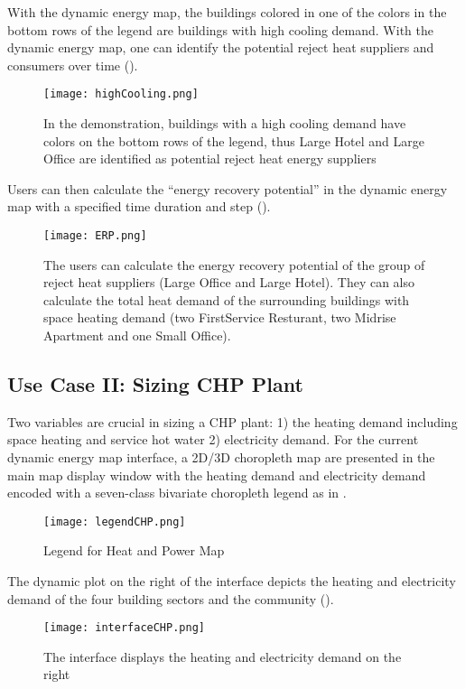 With the dynamic energy map, the buildings colored in one of the
colors in the bottom rows of the legend are buildings with high
cooling demand. With the dynamic energy map, one can identify
the potential reject heat suppliers and consumers over time
().

\begin{figure}[h!]
  \centering
  \texttt{[image: highCooling.png]}
  \caption[Identify Buildings with High Cooling Demand]{In the
    demonstration, buildings with a high cooling demand have colors on
    the bottom rows of the legend, thus Large Hotel and Large Office
    are identified as potential reject heat energy suppliers}
  \label{fig:highCooling}
\end{figure}

Users can then calculate the ``energy recovery potential'' in the
dynamic energy map with a specified time duration and step
().

\begin{figure}[h!]
  \centering
  \texttt{[image: ERP.png]}
  \caption[Calculate Energy Recovery Potential]{The users can
    calculate the energy recovery potential of the group of reject
    heat suppliers (Large Office and Large Hotel). They can also
    calculate the total heat demand of the surrounding buildings with
    space heating demand (two FirstService Resturant, two Midrise
    Apartment and one Small Office).}
  \label{fig:ERP}
\end{figure}

\subsection{Use Case II: Sizing CHP Plant}
Two variables are crucial in sizing a CHP plant: 1) the heating demand
including space heating and service hot water 2) electricity
demand. For the current dynamic energy map interface, a 2D/3D
choropleth map are presented in the main map display window with the
heating demand and electricity demand encoded with a seven-class
bivariate choropleth legend as in .
\begin{figure}[h!]
  \centering
  \texttt{[image: legendCHP.png]}
  \caption[Legend for Heat and Power Map]{Legend for Heat and Power
    Map}
  \label{fig:legendCHP}
\end{figure}
The dynamic plot on the right of the interface depicts the heating and
electricity demand of the four building sectors and the community
().
\begin{figure}[h!]
  \centering
  \texttt{[image: interfaceCHP.png]}
  \caption[Interface for CHP Sizing]{The interface displays the
    heating and electricity demand on the right}
  \label{fig:interfaceCHP}
\end{figure}

